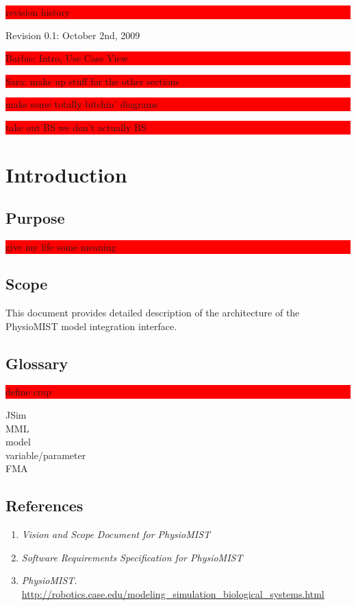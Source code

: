 \documentclass{article}
\title{\todo{PhysioMIST Design Crap}}
\author{Mark Caral, Sara Cummins, BarbaraJoy Jones, Joshua Lee}
\date{October 23, 2009\\{\sc Eecs} 393}
\newcommand{\todo}[1]{\colorbox{red}{\begin{minipage}{\textwidth}{#1}\end{minipage}}}
\begin{document}
\begin{titlepage}
\maketitle\thispagestyle{empty}
\end{titlepage}

\todo{revision history}
Revision 0.1: October 2nd, 2009
\newline
\todo{Barbie: Intro, Use Case View}
\todo{Sara: make up stuff for the other sections}
\newpage

\tableofcontents
\newpage

\todo{make some totally bitchin' diagrams}
\todo{take out BS we don't actually BS}

\section{Introduction}
\subsection{Purpose}
\todo{give my life some meaning}
\subsection{Scope}
This document provides detailed description of the architecture of the PhysioMIST model integration interface.
\subsection{Glossary}
\todo{define crap}
JSim\\
MML\\
model\\
variable/parameter\\
FMA
\subsection{References}
\begin{enumerate}
\item \emph{Vision and Scope Document for PhysioMIST}
\item \emph{Software Requirements Specification for PhysioMIST}
\item \emph{PhysioMIST.} \url{http://robotics.case.edu/modeling_simulation_biological_systems.html}
\end{enumerate}
\end{document}
